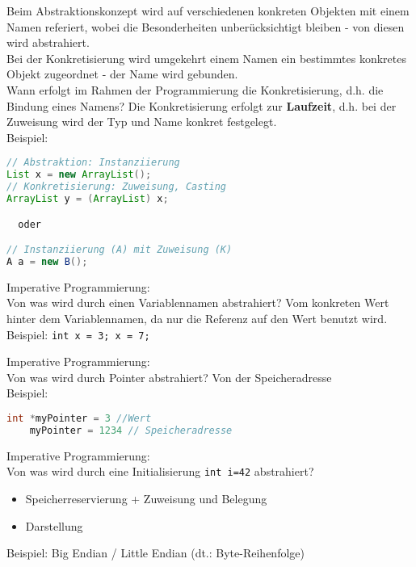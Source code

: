 \begin{card}
	Beim Abstraktionskonzept wird auf verschiedenen konkreten Objekten mit einem Namen referiert, wobei die Besonderheiten unberücksichtigt bleiben - von diesen wird abstrahiert.\\
	Bei der Konkretisierung wird umgekehrt einem Namen ein bestimmtes konkretes Objekt zugeordnet - der Name wird gebunden.\\
	Wann erfolgt im Rahmen der Programmierung die Konkretisierung, d.h. die Bindung	eines Namens?
	\hr
	Die Konkretisierung erfolgt zur \textbf{Laufzeit}, d.h. bei der Zuweisung wird der Typ und Name konkret festgelegt.\\
	Beispiel:
	\begin{lstlisting}[language=Java]
// Abstraktion: Instanziierung
List x = new ArrayList();
// Konkretisierung: Zuweisung, Casting
ArrayList y = (ArrayList) x;

  oder

// Instanziierung (A) mit Zuweisung (K)
A a = new B();
	\end{lstlisting}
\end{card}

\begin{card}
	Imperative Programmierung:\\
	Von was wird durch einen Variablennamen abstrahiert?
	\hr
	Vom konkreten Wert hinter dem Variablennamen, da nur die Referenz auf den Wert benutzt wird.\\
		Beispiel: \texttt{int x = 3; x = 7;}
\end{card}

\begin{card}
	Imperative Programmierung:\\
	Von was wird durch Pointer abstrahiert?
	\hr
	Von der Speicheradresse\\
	Beispiel:
	\begin{lstlisting}[language=C]
	int *myPointer = 3 //Wert
	myPointer = 1234 // Speicheradresse
	\end{lstlisting}
\end{card}

\begin{card}
	Imperative Programmierung:\\
	Von was wird durch eine Initialisierung \texttt{int i=42} abstrahiert?
	\hr
	\begin{itemize}
	\item Speicherreservierung + Zuweisung und Belegung
	\item Darstellung
	\end{itemize}
	Beispiel: Big Endian / Little Endian (dt.: Byte-Reihenfolge)
\end{card}

